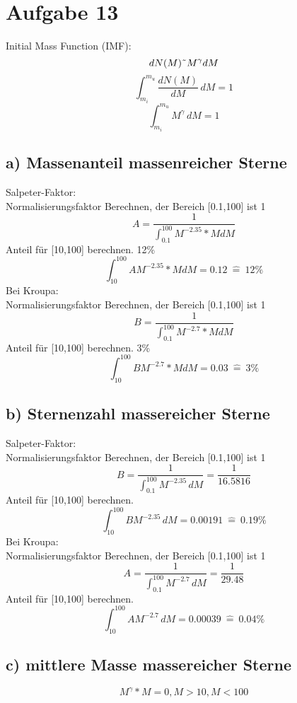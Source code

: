 \section{Aufgabe 13}
Initial Mass Function (IMF):
\begin{equation}
dN(M) \symbol{126} M^\gamma dM
\end{equation}
\begin{equation}
\int_{m_i}^{m_u} \frac{dN(M)}{dM} \, dM=1
\end{equation}
\begin{equation}
\int_{m_i}^{m_u} M^\gamma \, dM=1
\end{equation}
\subsection{a) Massenanteil massenreicher Sterne}
Salpeter-Faktor:\\
Normalisierungsfaktor Berechnen, der Bereich [0.1,100] ist 1
\begin{equation}
A=\frac{1}{\int _{0.1}^{100}M^{-2.35}*MdM}
\end{equation}
Anteil für [10,100] berechnen.
12\%
\begin{equation}
\int _{10}^{100}A M^{-2.35}*MdM = 0.12 ~ \widehat{=} ~ 12\%
\end{equation}
Bei Kroupa:\\
Normalisierungsfaktor Berechnen, der Bereich [0.1,100] ist 1
\begin{equation}
B=\frac{1}{\int _{0.1}^{100}M^{-2.7}*MdM}
\end{equation}
Anteil für [10,100] berechnen.
3\%
\begin{equation}
\int _{10}^{100}B M^{-2.7}*MdM = 0.03 ~ \widehat{=} ~ 3\%
\end{equation}
\subsection{b) Sternenzahl massereicher Sterne}

Salpeter-Faktor:\\
Normalisierungsfaktor Berechnen, der Bereich [0.1,100] ist 1
\begin{equation}
B = \frac{1}{\int_{0.1}^{100} M^{-2.35} \, dM} = \frac{1}{16.5816}
\end{equation}
Anteil für [10,100] berechnen.
\begin{equation}
\int_{10}^{100} B M^{-2.35} \, dM = 0.00191 ~ \widehat{=} ~ 0.19\%
\end{equation}
Bei Kroupa:\\
Normalisierungsfaktor Berechnen, der Bereich [0.1,100] ist 1
\begin{equation}
A = \frac{1}{\int_{0.1}^{100} M^{-2.7} \, dM} = \frac{1}{29.48}
\end{equation}
Anteil für [10,100] berechnen.
\begin{equation}
\int_{10}^{100} A M^{-2.7} \, dM = 0.00039 ~ \widehat{=} ~ 0.04\%
\end{equation}
\subsection{c) mittlere Masse massereicher Sterne}
\begin{equation}
M^\gamma * M = 0, M > 10, M < 100
\end{equation}
